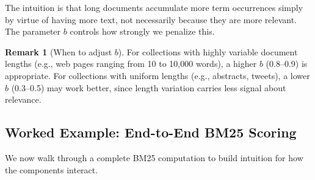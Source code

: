 \documentclass[11pt,a4paper]{article}
\theoremstyle{definition}
\newtheorem{remark}{Remark}[section]
\theoremstyle{plain}
\begin{document}
The intuition is that long documents accumulate more term occurrences simply by virtue of having more text, not necessarily because they are more relevant. The parameter $b$ controls how strongly we penalize this.

\begin{remark}[When to adjust $b$]
For collections with highly variable document lengths (e.g., web pages ranging from 10 to 10{,}000 words), a higher $b$ (0.8--0.9) is appropriate. For collections with uniform lengths (e.g., abstracts, tweets), a lower $b$ (0.3--0.5) may work better, since length variation carries less signal about relevance.
\end{remark}

\subsection{Worked Example: End-to-End BM25 Scoring}
\label{sec:bm25worked}

We now walk through a complete BM25 computation to build intuition for how the components interact.
\end{document}

